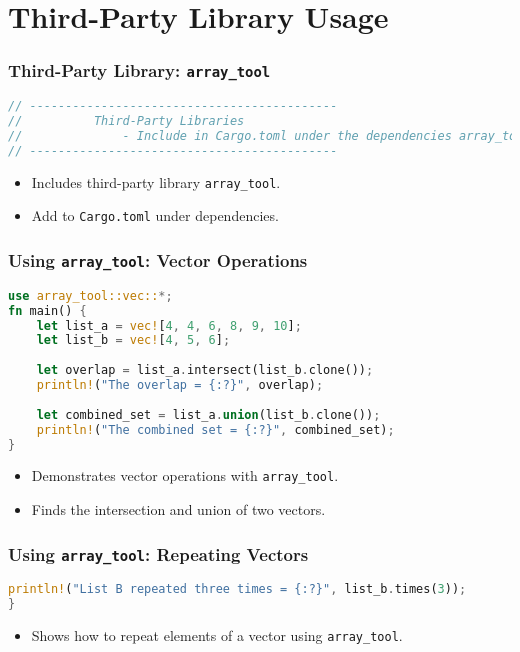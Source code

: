 \documentclass[aspectratio=169, table]{beamer}
\begin{document}
\section{Third-Party Library Usage}

\begin{frame}[fragile]
\frametitle{Third-Party Library: \texttt{array\_tool}}
\begin{lstlisting}[language=Rust]
// -------------------------------------------
//          Third-Party Libraries
//              - Include in Cargo.toml under the dependencies array_tool = "1.0.3"
// -------------------------------------------
\end{lstlisting}
\begin{itemize}
\item Includes third-party library \texttt{array\_tool}.
\item Add to \texttt{Cargo.toml} under dependencies.
\end{itemize}
\end{frame}

\begin{frame}[fragile]
\frametitle{Using \texttt{array\_tool}: Vector Operations}
\begin{lstlisting}[language=Rust]
use array_tool::vec::*;
fn main() {
	let list_a = vec![4, 4, 6, 8, 9, 10];
	let list_b = vec![4, 5, 6];
	
	let overlap = list_a.intersect(list_b.clone());
	println!("The overlap = {:?}", overlap);
	
	let combined_set = list_a.union(list_b.clone());
	println!("The combined set = {:?}", combined_set);
}
\end{lstlisting}
\begin{itemize}
\item Demonstrates vector operations with \texttt{array\_tool}.
\item Finds the intersection and union of two vectors.
\end{itemize}
\end{frame}

\begin{frame}[fragile]
\frametitle{Using \texttt{array\_tool}: Repeating Vectors}
\begin{lstlisting}[language=Rust]
	println!("List B repeated three times = {:?}", list_b.times(3));
}
\end{lstlisting}
\begin{itemize}
\item Shows how to repeat elements of a vector using \texttt{array\_tool}.
\end{itemize}
\end{frame}
\end{document}
